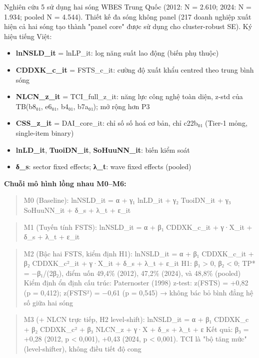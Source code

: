 \documentclass[12pt,a4paper]{article}
\providecommand{\tightlist}{\setlength{\itemsep}{0pt}\setlength{\parskip}{0pt}}
\begin{document}
Nghiên cứu 5 sử dụng hai sóng WBES Trung Quốc (2012: N = 2.610; 2024: N
= 1.934; pooled N = 4.544). Thiết kế đa sóng không panel (217 doanh
nghiệp xuất hiện cả hai sóng tạo thành "panel core" được sử dụng cho
cluster-robust SE). Ký hiệu tiếng Việt:

\begin{itemize}
\tightlist
\item
  \textbf{lnNSLD\_it} = lnLP\_it: log năng suất lao động (biến phụ
  thuộc)
\item
  \textbf{CDDXK\_c\_it} = FSTS\_c\_it: cường độ xuất khẩu centred theo
  trung bình sóng
\item
  \textbf{NLCN\_z\_it} = TCI\_full\_z\_it: năng lực công nghệ toàn diện,
  z-std của TB(b8₀₁, e6₀₁, b4₀₁, b7a₀₁); mở rộng hơn P3
\item
  \textbf{CSS\_z\_it} = DAI\_core\_it: chỉ số số hoá cơ bản, chỉ c22b₀₁
  (Tier-1 mỏng, single-item binary)
\item
  \textbf{lnLD\_it}, \textbf{TuoiDN\_it}, \textbf{SoHuuNN\_it}: biến
  kiểm soát
\item
  \textbf{δ\_s}: sector fixed effects; \textbf{λ\_t}: wave fixed effects
  (pooled)
\end{itemize}

\textbf{Chuỗi mô hình lồng nhau M0--M6:}

\begin{quote}
M0 (Baseline): lnNSLD\_it = α + γ₁ lnLD\_it + γ₂ TuoiDN\_it + γ₃
SoHuuNN\_it + δ\_s + λ\_t + ε\_it
\end{quote}

\begin{quote}
M1 (Tuyến tính FSTS): lnNSLD\_it = α + β₁ CDDXK\_c\_it + γ·X\_it + δ\_s
+ λ\_t + ε\_it
\end{quote}

\begin{quote}
M2 (Bậc hai FSTS, kiểm định H1): lnNSLD\_it = α + β₁ CDDXK\_c\_it + β₂
CDDXK\_c²\_it + γ·X\_it + δ\_s + λ\_t + ε\_it H1: β₁ \textgreater{} 0,
β₂ \textless{} 0; TP* = −β₁/(2β₂), điểm uốn 49,4\% (2012), 47,2\%
(2024), và 48,8\% (pooled) Kiểm định ổn định cấu trúc: Paternoster
(1998) z-test: z(FSTS) = +0,82 (p = 0,412); z(FSTS²) = −0,61 (p = 0,545)
→ không bác bỏ bình đẳng hệ số giữa hai sóng
\end{quote}

\begin{quote}
M3 (+ NLCN trực tiếp, H2 level-shift): lnNSLD\_it = α + β₁ CDDXK\_c + β₂
CDDXK\_c² + β₃ NLCN\_z + γ·X + δ\_s + λ\_t + ε Kết quả: β₃ = +0,28
(2012, p \textless{} 0,001), +0,43 (2024, p \textless{} 0,001). TCI là
"bộ tăng mức" (level-shifter), không điều tiết độ cong
\end{quote}
\end{document}
